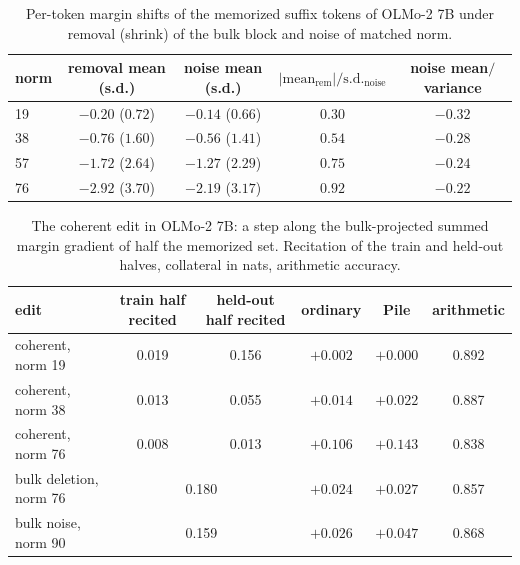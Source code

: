 \documentclass{article}
\theoremstyle{definition}\newtheorem{law}{Empirical law}
\begin{document}
\begin{table}[t]
\centering\small
\caption{Per-token margin shifts of the memorized suffix tokens of OLMo-2 7B under removal (shrink) of the bulk block and noise of matched norm.}\label{tab:margins}
\begin{tabular}{lcccc}\toprule
norm & removal mean (s.d.) & noise mean (s.d.) & $|\text{mean}_{\text{rem}}|/\text{s.d.}_{\text{noise}}$ & noise mean$/$variance\\\midrule
19 & $-0.20$ ($0.72$) & $-0.14$ ($0.66$) & $0.30$ & $-0.32$\\
38 & $-0.76$ ($1.60$) & $-0.56$ ($1.41$) & $0.54$ & $-0.28$\\
57 & $-1.72$ ($2.64$) & $-1.27$ ($2.29$) & $0.75$ & $-0.24$\\
76 & $-2.92$ ($3.70$) & $-2.19$ ($3.17$) & $0.92$ & $-0.22$\\\bottomrule
\end{tabular}
\end{table}

\begin{table}[t]
\centering\small
\caption{The coherent edit in OLMo-2 7B: a step along the bulk-projected summed margin gradient of half the memorized set. Recitation of the train and held-out halves, collateral in nats, arithmetic accuracy.}\label{tab:targeted}
\begin{tabular}{lccccc}\toprule
edit & train half recited & held-out half recited & ordinary & Pile & arithmetic\\\midrule
coherent, norm 19 & 0.019 & 0.156 & $+0.002$ & $+0.000$ & 0.892\\
coherent, norm 38 & 0.013 & 0.055 & $+0.014$ & $+0.022$ & 0.887\\
coherent, norm 76 & 0.008 & 0.013 & $+0.106$ & $+0.143$ & 0.838\\\midrule
bulk deletion, norm 76 & \multicolumn{2}{c}{0.180} & $+0.024$ & $+0.027$ & 0.857\\
bulk noise, norm 90 & \multicolumn{2}{c}{0.159} & $+0.026$ & $+0.047$ & 0.868\\\bottomrule
\end{tabular}
\end{table}
\end{document}
